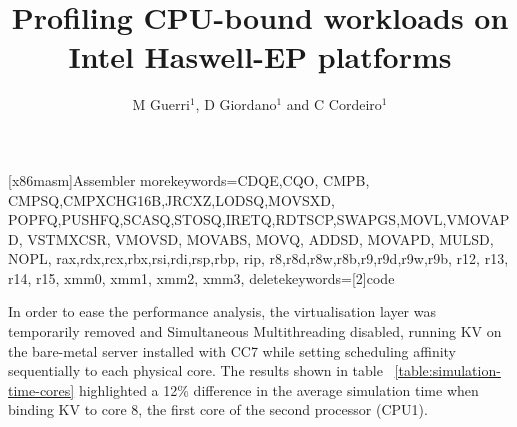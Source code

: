 \documentclass[a4paper]{jpconf}
\begin{document}
\title{Profiling CPU-bound workloads on Intel Haswell-EP platforms}

\author{M Guerri$^1$, D Giordano$^1$ and C Cordeiro$^1$}
\address{$^1$ CERN}


   [x86masm]{Assembler}
   {morekeywords={CDQE,CQO, CMPB, CMPSQ,CMPXCHG16B,JRCXZ,LODSQ,MOVSXD,
                  POPFQ,PUSHFQ,SCASQ,STOSQ,IRETQ,RDTSCP,SWAPGS,MOVL,VMOVAPD,
                  VSTMXCSR, VMOVSD, MOVABS, MOVQ, ADDSD, MOVAPD, MULSD, NOPL,
                  rax,rdx,rcx,rbx,rsi,rdi,rsp,rbp, rip,
                  r8,r8d,r8w,r8b,r9,r9d,r9w,r9b, r12, r13, r14, r15,
                  xmm0, xmm1, xmm2, xmm3},
    deletekeywords=[2]{code}
    }
\newcommand\realnumberstyle[1]{}

\makeatletter
\newcommand{\zebra}[3]{%
    {\realnumberstyle{#3}}%
    \begingroup
    \lst@basicstyle
    \ifodd\value{lstnumber}%
        \color{#1}%
    \else
        \color{#2}%
    \fi
        \rlap{\hspace*{\lst@numbersep}%
        \color@block{\linewidth}{\ht\strutbox}{\dp\strutbox}%
        }%
    \endgroup
}
\makeatother




In order to ease the performance analysis, the virtualisation layer was
temporarily removed and Simultaneous Multithreading disabled, running KV on
the bare-metal server installed with CC7 while setting scheduling affinity sequentially to each physical
core. The results shown in table ~\ref{table:simulation-time-cores}
highlighted a 12\% difference in the average simulation
time when binding KV to core 8, the first core of the second processor (CPU1).
\end{document}
